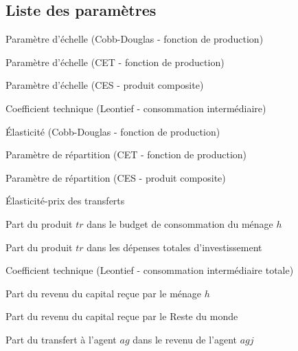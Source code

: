 \documentclass[11pt,a4paper]{article}
\newcommand{\ag}{\mathit{ag}}
\newcommand{\agj}{\mathit{agj}}
\newcommand{\aij}{\mathit{aij}}
\newcommand{\io}{\mathit{io}}
\newcommand{\tr}{\mathit{tr}}
\newcommand{\trj}{\mathit{trj}}
\newcommand{\CH}{\mathit{CH}}
\newcommand{\INV}{\mathit{INV}}
\newcommand{\TRA}{\mathit{TRA}}
\begin{document}
	
	\subsection{Liste des paramètres}
	\begin{description}[leftmargin=!,labelwidth=\widthof{\bfseries AAAAAAAA},parsep=10.5pt]
		\item[$A_{\tr}$] Paramètre d'échelle (Cobb-Douglas - \textit{}fonction de production)
		
		\item[$A_{\trj}^E$] Paramètre d'échelle (CET -  fonction de production)
		
		\item[$A_{\tr}^M$] Paramètre d'échelle (CES -  produit composite)
		
		\item[$\aij_{\tr,j}$] Coefficient technique (Leontief - consommation intermédiaire)
		
		\item[$\alpha_{\tr}$] Élasticité (Cobb-Douglas - fonction de production)
		
		\item[$\beta_{\tr}^E$] Paramètre de répartition (CET - fonction de production)		
		
		\item[$\beta_{\tr}^M$] Paramètre de répartition (CES - produit composite)
		
		\item[$\eta$]    Élasticité-prix des transferts		
		
		\item[$\gamma^{\CH}_{\tr,h}$] Part du produit $\tr$ dans le budget de consommation du ménage $h$
		
		\item[$\gamma^{\INV}_{\tr}$] Part du produit $\tr$ dans les dépenses totales d'investissement
		
		\item[$\io_{j}$] Coefficient technique (Leontief - consommation intermédiaire totale)
		
		\item[$\lambda_h$] Part du revenu du capital reçue par le ménage $h$
		
		\item[$\lambda^R$] Part du revenu du capital reçue par le Reste du monde	
		
		\item[$\lambda^{\TRA}_{\ag,\agj}$] Part du transfert à l'agent $\ag$ dans le revenu de l'agent $\agj$
		

\end{description}
\end{document}
